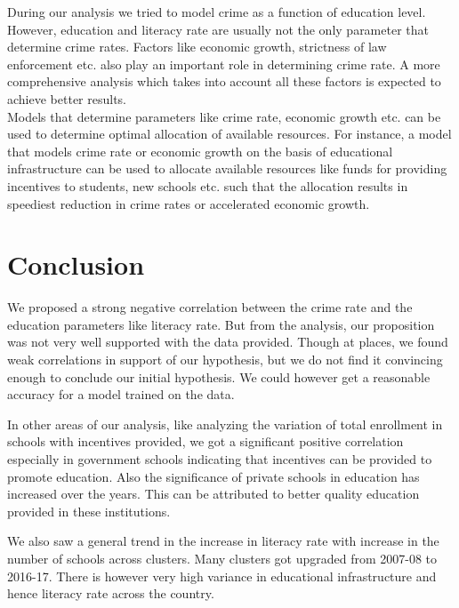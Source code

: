 \documentclass[twoside]{article}
\begin{document}
During our analysis we tried to model crime as a function of education level. However, education and literacy rate are usually not the only parameter that determine crime rates. Factors like economic growth, strictness of law enforcement etc. also play an important role in determining crime rate. A more comprehensive analysis which takes into account all these factors is expected to achieve better results.\\

Models that determine parameters like crime rate, economic growth etc. can be used to determine optimal allocation of available resources. For instance, a model that models crime rate or economic growth on the basis of educational infrastructure can be used to allocate available resources like funds for providing incentives to students, new schools etc. such that the allocation results in speediest reduction in crime rates or accelerated economic growth.

\vspace*{-0.6cm}
\section*{Conclusion}
\vspace*{-0.4cm}
We proposed a strong negative correlation between the crime rate and the education parameters like literacy rate. But from the analysis, our proposition was not very well supported with the data provided. Though at places, we found weak correlations in support of our hypothesis, but we do not find it convincing enough to conclude our initial hypothesis. We could however get a reasonable accuracy for a model trained on the data.

In other areas of our analysis, like analyzing the variation of total enrollment in schools with incentives provided, we got a significant positive correlation especially in government schools indicating that incentives can be provided to promote education. Also the significance of private schools in education has increased over the years. This can be attributed to better quality education provided in these institutions. 

We also saw a general trend in the increase in literacy rate with increase in the number of schools across clusters. Many clusters got upgraded from 2007-08 to 2016-17. There is however very high variance in educational infrastructure and hence literacy rate across the country.
\vspace{-0.5cm}
\end{document}
